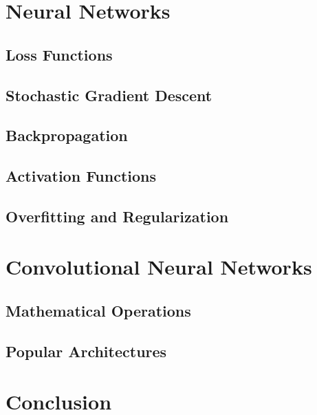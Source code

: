 \section{Neural Networks}
\label{sec:neural_networks}

\subsection{Loss Functions}
\label{sec:loss_functions}

\subsection{Stochastic Gradient Descent}
\label{sec:sgd}

\subsection{Backpropagation}
\label{sec:backprop}

\subsection{Activation Functions}
\label{sec:activations}

\subsection{Overfitting and Regularization}
\label{sec:regularization}


\section{Convolutional Neural Networks}
\label{sec:convolutional_networks}

\subsection{Mathematical Operations}
\label{sec:operations}

\subsection{Popular Architectures}
\label{sec:architectures}


\section{Conclusion}
\label{sec:conclusion01}
